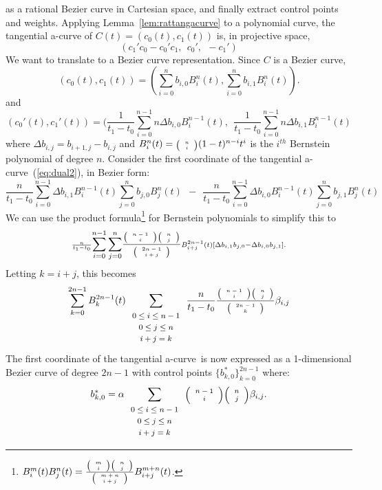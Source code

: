 \documentclass[12pt]{article}
\newcommand{\scriptchoice}[2]{\mbox{\scriptsize{$\left( \begin{array}{c} #1 \\ #2 \end{array} \right)$}}}
\newcommand{\tinychoice}[2]{\mbox{\tiny{$\left( \begin{array}{c} #1 \\ #2 \end{array} \right)$}}}
\newcommand{\atang}{tangential a-curve\ }
\begin{document}
as a rational Bezier curve in Cartesian space,
and finally extract control points and weights.
Applying Lemma~\ref{lem:rattangacurve} to a polynomial curve,
the tangential a-curve of $C(t) = (c_0(t), c_1(t))$ is, in projective space,
\begin{equation}
\label{eq:dual2}
	(c_1'c_0 - c_0' c_1, \ \ c_0', \ \ -c_1')
\end{equation}
We want to translate to a Bezier curve representation.
Since $C$ is a Bezier curve,
\[
(c_0(t), c_1(t)) = (\sum_{i=0}^n b_{i,0} B_i^n(t), \sum_{i=0}^n b_{i,1} B_i^n(t)).
\]
and
\[
(c_0'(t), c_1'(t)) = (\frac{1}{t_1-t_0} \sum_{i=0}^{n-1}  n \Delta b_{i,0} B_i^{n-1}(t),\ \ 
		      \frac{1}{t_1-t_0} \sum_{i=0}^{n-1}  n \Delta b_{i,1} B_i^{n-1}(t)
\]
where $\Delta b_{i,j} = b_{i+1,j} - b_{i,j}$ and
$B_i^n(t) = \tinychoice{n}{i} (1-t)^{n-i} t^i$ is the $i^{th}$ Bernstein
polynomial of degree $n$.
Consider the first coordinate of the \atang (\ref{eq:dual2}), in Bezier form:
\[
\scriptstyle{\frac{n}{t_1-t_0}}
\displaystyle{\sum_{i=0}^{n-1}} \scriptstyle{\Delta b_{i,1} B_i^{n-1}(t)}
\displaystyle{\sum_{j=0}^n}     \scriptstyle{       b_{j,0} B_j^n(t)}
\ \  - \ \ 
\scriptstyle{\frac{n}{t_1-t_0}}
\displaystyle{\sum_{i=0}^{n-1}} \scriptstyle{\Delta b_{i,0} B_i^{n-1}(t)}
\displaystyle{\sum_{j=0}^n}	\scriptstyle{       b_{j,1} B_j^n(t)}
\]
We can use the product formula\footnote{$B_i^m(t) B_j^n(t) = \frac{ \tinychoice{m}{i} \tinychoice{n}{j} }{ \tinychoice{m+n}{i+j} } B_{i+j}^{m+n}(t)$.}
for Bernstein polynomials \cite{farin97} to simplify this to
\[
\scriptstyle{\frac{n}{t_1-t_0}}
\displaystyle{\sum_{i=0}^{n-1} \sum_{j=0}^n }
\frac{\tinychoice{n-1}{i} \tinychoice{n}{j}}{ \tinychoice{2n-1}{i+j} } 
\scriptstyle{ B_{i+j}^{2n-1}(t) [ \Delta b_{i,1} b_{j,0} - \Delta b_{i,0} b_{j,1} ]}.
\]
Letting $k=i+j$, this becomes
\[
\sum_{k=0}^{2n-1} B_k^{2n-1}(t) 
\sum_{\begin{array}{c} \mbox{\footnotesize{$0 \leq i \leq n-1$}} \\ 
			     \mbox{\footnotesize{$0 \leq j \leq n$}} \\ 
			     \mbox{\footnotesize{$i+j=k$}}
			     \end{array}}
\frac{n}{t_1-t_0} \frac{ \tinychoice{n-1}{i} \tinychoice{n}{j} }{ \tinychoice{2n-1}{k} }
\beta_{i,j}
\]
The first coordinate of the \atang is now expressed as a 1-dimensional Bezier curve of 
degree $2n-1$ with control points $\{b^*_{k,0} \}_{k=0}^{2n-1}$ where:
\begin{equation}
\label{eq:dualw2}
b^*_{k,0} = \alpha
\sum_{\begin{array}{c} \mbox{\footnotesize{$0 \leq i \leq n-1$}} \\ 
			     \mbox{\footnotesize{$0 \leq j \leq n$}} \\ 
			     \mbox{\footnotesize{$i+j=k$}}
			     \end{array}}
\scriptchoice{n-1}{i} \scriptchoice{n}{j} \beta_{i,j}.
\end{equation}
\end{document}
